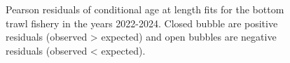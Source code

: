 \documentclass[
]{scrartcl}
\begin{document}
\begin{figure}[H]


\caption{\label{fig-peasrson-resids-age-bt2}Pearson residuals of
conditional age at length fits for the bottom trawl fishery in the years
2022-2024. Closed bubble are positive residuals (observed \textgreater{}
expected) and open bubbles are negative residuals (observed \textless{}
expected).}

\end{figure}%
\end{document}
